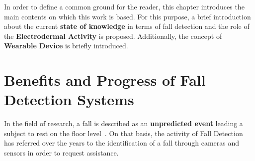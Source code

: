 \label{ch:background}

In order to define a common ground for the reader, this chapter introduces the main contents on which this work is based. For this purpose, a brief introduction about the current \textbf{state of knowledge} in terms of fall detection and the role of the \textbf{Electrodermal Activity} is proposed. Additionally, the concept of \textbf{Wearable Device} is briefly introduced.

\section{Benefits and Progress of Fall Detection Systems }\label{sec:sectionname}

In the field of research, a fall is described as an \textbf{unpredicted event} leading a subject to rest on the floor level~\cite{Lamb1}. On that basis, the activity of Fall Detection has referred over the years to the identification of a fall through cameras and sensors in order to request assistance.


